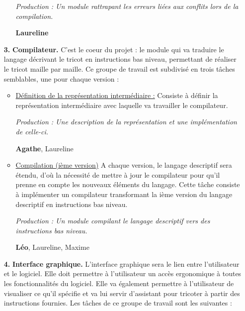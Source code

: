 \documentclass{article}
\begin{document}
\begin{itemize}
\begin{itemize}
      \textit{Production : Un module rattrapant les erreurs liées aux conflits lors de la compilation.}

      \textbf{Laureline}

    \end{itemize}

\medskip

\item[\textbf{3.}] \textbf{Compilateur.} C'est le coeur du projet : le module qui va traduire le langage décrivant le tricot en instructions
bas niveau, permettant de réaliser le tricot maille par maille. Ce groupe de travail est subdivisé en trois tâches semblables, une pour
chaque version :

    \begin{itemize}
    \item \underline{Définition de la représentation intermédiaire :} Consiste à définir la représentation intermédiaire avec laquelle va travailler le compilateur.

      \textit{Production : Une description de la représentation et une implémentation de celle-ci.}

      \textbf{Agathe}, Laureline

    \item \underline{Compilation (ième version)} A chaque version, le langage descriptif sera étendu, d'où la nécessité de mettre à jour le
compilateur pour qu'il prenne en compte les nouveaux éléments du langage. Cette tâche consiste à implémenter un compilateur transformant
la ième version du langage descriptif en instructions bas niveau.

      \textit{Production : Un module compilant le langage descriptif vers des instructions bas niveau.}

      \textbf{Léo}, Laureline, Maxime %
    \end{itemize}

\medskip

\item[\textbf{4.}] \textbf{Interface graphique.} L'interface graphique sera le lien entre l'utilisateur et le logiciel. Elle doit permettre à
l'utilisateur un accès ergonomique à toutes les fonctionnalités du logiciel. Elle va également permettre à l'utilisateur de visualiser ce
qu'il spécifie et va lui servir d'assistant pour tricoter à partir des instructions fournies. Les tâches de ce groupe de travail sont les
suivantes :


\end{itemize}
\end{document}
